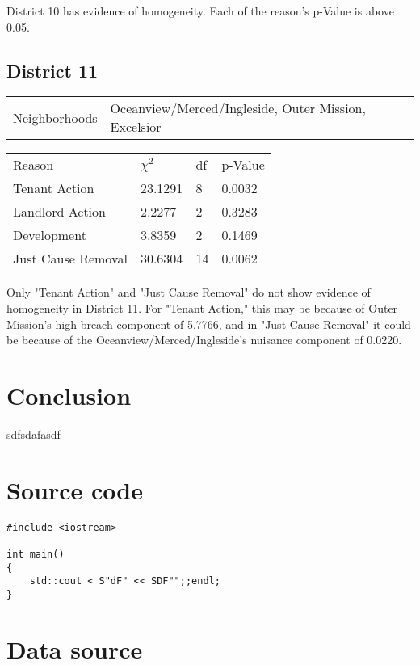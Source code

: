 \documentclass[]{article}
\begin{document}
District 10 has evidence of homogeneity. Each of the reason's p-Value is above 0.05.

\subsection{District 11}

\begin{table}[!h]
	\centering
	\begin{tabular}{l | l}
		Neighborhoods &  Oceanview/Merced/Ingleside, Outer Mission, Excelsior  \\
	\end{tabular}
\end{table}
\FloatBarrier

\begin {table}[!h]
\centering
\begin{tabular}{l | l | l | l}
	
	Reason				 &  $\chi ^{2}$ & df & p-Value \\
	Tenant Action 		   &  23.1291  &  8  & 0.0032 \\
	Landlord Action	       &   2.2277 &  2  & 0.3283 \\
	Development			   &  3.8359  &  2  & 0.1469 \\
	Just Cause Removal	   &  30.6304  &  14  & 0.0062 \\
\end{tabular} \newline
\end{table}
\FloatBarrier

Only "Tenant Action" and "Just Cause Removal" do not show evidence of homogeneity in District 11. For "Tenant Action," this may be because of Outer Mission's high breach component of 5.7766, and in "Just Cause Removal" it could be because of the Oceanview/Merced/Ingleside's nuisance component of 0.0220.



\section{Conclusion}
sdfsdafasdf
\newpage
\appendix
\section{Source code}
\begin{lstlisting}
#include <iostream>

int main()
{
	std::cout < S"dF" << SDF"";;endl;
}
\end{lstlisting}

\section{Data source}
\end{document}
